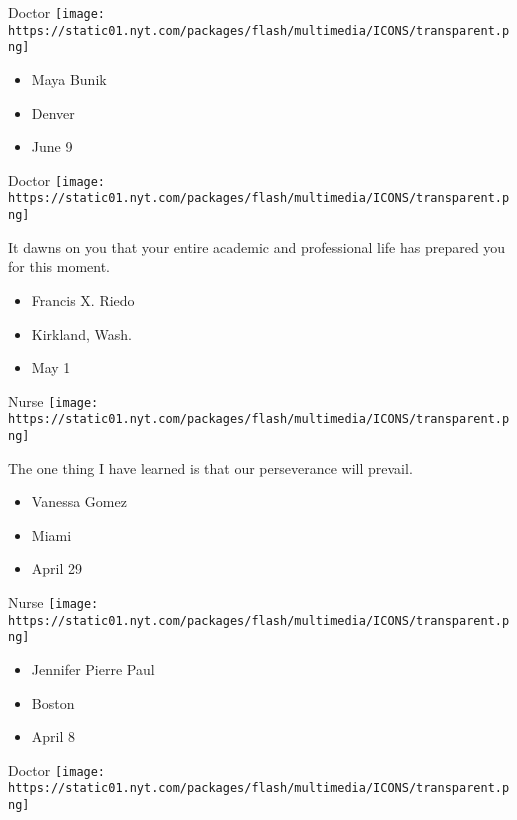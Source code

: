 \protect\hyperlink{item-maya-bunik}{}

Doctor
\texttt{[image: https://static01.nyt.com/packages/flash/multimedia/ICONS/transparent.png]}

\begin{itemize}
\tightlist
\item
  Maya Bunik
\item
  Denver
\item
  June 9
\end{itemize}

\protect\hyperlink{item-francis-x-riedo}{}

Doctor
\texttt{[image: https://static01.nyt.com/packages/flash/multimedia/ICONS/transparent.png]}

It dawns on you that your entire academic and professional life has
prepared you for this moment.

\begin{itemize}
\tightlist
\item
  Francis X. Riedo
\item
  Kirkland, Wash.
\item
  May 1
\end{itemize}

\protect\hyperlink{item-vanessa-gomez}{}

Nurse
\texttt{[image: https://static01.nyt.com/packages/flash/multimedia/ICONS/transparent.png]}

The one thing I have learned is that our perseverance will prevail.

\begin{itemize}
\tightlist
\item
  Vanessa Gomez
\item
  Miami
\item
  April 29
\end{itemize}

\protect\hyperlink{item-jennifer-pierre-paul}{}

Nurse
\texttt{[image: https://static01.nyt.com/packages/flash/multimedia/ICONS/transparent.png]}

\begin{itemize}
\tightlist
\item
  Jennifer Pierre Paul
\item
  Boston
\item
  April 8
\end{itemize}

\protect\hyperlink{item-kie-yamamoto}{}

Doctor
\texttt{[image: https://static01.nyt.com/packages/flash/multimedia/ICONS/transparent.png]}

